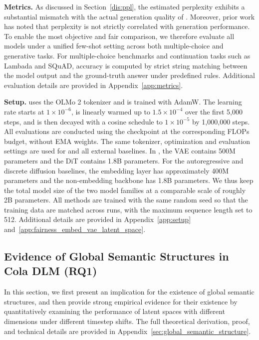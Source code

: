 \textbf{Metrics. }
As discussed in Section~\ref{dis:ppl}, the estimated perplexity exhibits a substantial mismatch with the actual generation quality of \method. Moreover, prior work \citep{wang2023knn, hashimoto2019unifying, holtzman2019curious, meister2021language} has noted that perplexity is not strictly correlated with generation performance. To enable the most objective and fair comparison, we therefore evaluate all models under a unified few-shot setting across both multiple-choice and generative tasks. For multiple-choice benchmarks and continuation tasks such as Lambada and SQuAD, accuracy is computed by strict string matching between the model output and the ground-truth answer under predefined rules. Additional evaluation details are provided in Appendix~\ref{app:metrics}.

\textbf{Setup. }
\method uses the OLMo 2 \citep{olmo20242} tokenizer and is trained with AdamW. The learning rate starts at \(1\times10^{-6}\), is linearly warmed up to \(1.5\times10^{-4}\) over the first 5{,}000 steps, and is then decayed with a cosine schedule to \(1\times10^{-5}\) by 1{,}000{,}000 steps. All evaluations are conducted using the checkpoint at the corresponding FLOPs budget, without EMA weights. The same tokenizer, optimization and evaluation settings are used for \method and all external baselines. In \method, the VAE contains 500M parameters and the DiT contains 1.8B parameters. For the autoregressive and discrete diffusion baselines, the embedding layer has approximately 400M parameters and the non-embedding backbone has 1.8B parameters. We thus keep the total model size of the two model families at a comparable scale of roughly 2B parameters. All methods are trained with the same random seed so that the training data are matched across runs, with the maximum sequence length set to 512. Additional details are provided in Appendix~\ref{app:setup} and~\ref{app:fairness_embed_vae_latent_space}.

\subsection{Evidence of Global Semantic Structures in Cola DLM (RQ1)}
\label{exp:rq1}
In this section, we first present an implication for the existence of global semantic structures, and then provide strong empirical evidence for their existence by quantitatively examining the performance of latent spaces with different dimensions under different timestep shifts. The full theoretical derivation, proof, and technical details are provided in Appendix~\ref{sec:global_semantic_structure}.

